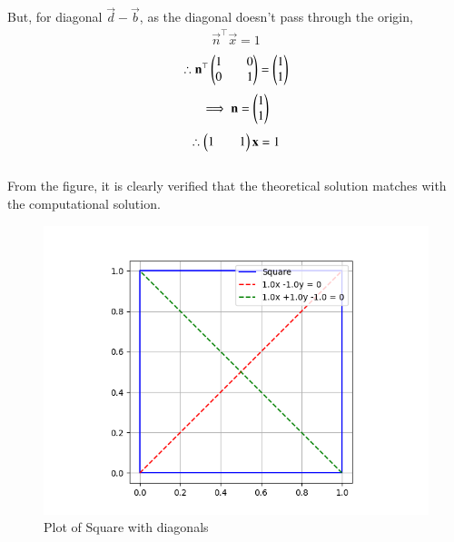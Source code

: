 \documentclass[journal]{IEEEtran}
\begin{document}
But, for diagonal $\vec{d}-\vec{b}$, as the diagonal doesn't pass through the origin,
\begin{align}
    \vec{n}^{\top}\vec{x}=1
\end{align}
\begin{align}
    \therefore \mathbf{n}^{\top}\begin{pmatrix}1&&0\\0&&1\end{pmatrix}=\begin{pmatrix}1\\1\end{pmatrix}
\end{align}
\begin{align}
    \implies \mathbf{n}=\begin{pmatrix}1\\1\end{pmatrix}
\end{align}
\begin{align}
    \therefore \begin{pmatrix}1&&1\end{pmatrix}\mathbf{x}=1
\end{align}
\\
From the figure, it is clearly verified that the theoretical solution matches with the computational solution.\\
\begin{figure}[H]
    \centering
    \includegraphics[width=0.6\columnwidth]{figs/Figure_1.png}
    \caption*{Plot of Square with diagonals}
    \label{fig:1}
\end{figure}
\end{document}
